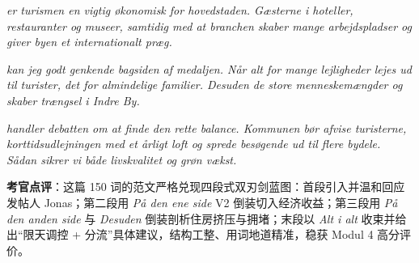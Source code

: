 \begin{answerbox}
\textit{ er turismen en vigtig økonomisk  for hovedstaden. Gæsterne  i hoteller, restauranter og museer, samtidig med at branchen skaber mange arbejdspladser og giver byen et internationalt præg.}

\textit{ kan jeg godt genkende bagsiden af medaljen. Når alt for mange lejligheder lejes ud til turister,  det  for almindelige familier. Desuden  de store menneskemængder  og skaber trængsel i Indre By.}

\textit{ handler debatten om at finde den rette balance. Kommunen bør  afvise turisterne,  korttidsudlejningen med et årligt loft og sprede besøgende ud til flere bydele. Sådan sikrer vi både livskvalitet og grøn vækst.}

\small\textbf{考官点评}：这篇 150 词的范文严格兑现四段式双刃剑蓝图：首段引入并温和回应发帖人 Jonas；第二段用 \textit{På den ene side} V2 倒装切入经济收益；第三段用 \textit{På den anden side} 与 \textit{Desuden} 倒装剖析住房挤压与拥堵；末段以 \textit{Alt i alt} 收束并给出“限天调控 + 分流”具体建议，结构工整、用词地道精准，稳获 Modul 4 高分评价。
\end{answerbox}
